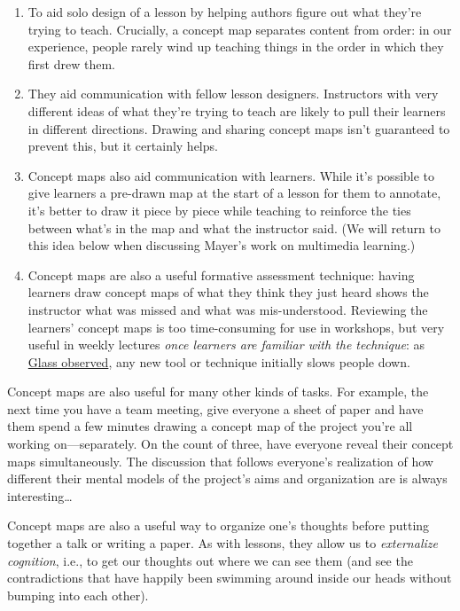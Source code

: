 \begin{enumerate}
\def\labelenumi{\arabic{enumi}.}
\itemsep1pt\parskip0pt
\item
  To aid solo design of a lesson by helping authors figure out what
  they're trying to teach. Crucially, a concept map separates content
  from order: in our experience, people rarely wind up teaching things
  in the order in which they first drew them.
\item
  They aid communication with fellow lesson designers. Instructors with
  very different ideas of what they're trying to teach are likely to
  pull their learners in different directions. Drawing and sharing
  concept maps isn't guaranteed to prevent this, but it certainly helps.
\item
  Concept maps also aid communication with learners. While it's possible
  to give learners a pre-drawn map at the start of a lesson for them to
  annotate, it's better to draw it piece by piece while teaching to
  reinforce the ties between what's in the map and what the instructor
  said. (We will return to this idea below when discussing Mayer's work
  on multimedia learning.)
\item
  Concept maps are also a useful formative assessment technique: having
  learners draw concept maps of what they think they just heard shows
  the instructor what was missed and what was mis-understood. Reviewing
  the learners' concept maps is too time-consuming for use in workshops,
  but very useful in weekly lectures \emph{once learners are familiar
  with the technique}: as
  \href{http://www.amazon.com/Facts-Fallacies-Software-Engineering-Robert/dp/0321117425/}{Glass
  observed}, any new tool or technique initially slows people down.
\end{enumerate}

Concept maps are also useful for many other kinds of tasks. For example,
the next time you have a team meeting, give everyone a sheet of paper
and have them spend a few minutes drawing a concept map of the project
you're all working on---separately. On the count of three, have everyone
reveal their concept maps simultaneously. The discussion that follows
everyone's realization of how different their mental models of the
project's aims and organization are is always interesting\ldots{}

Concept maps are also a useful way to organize one's thoughts before
putting together a talk or writing a paper. As with lessons, they allow
us to \emph{externalize cognition}, i.e., to get our thoughts out where
we can see them (and see the contradictions that have happily been
swimming around inside our heads without bumping into each other).

